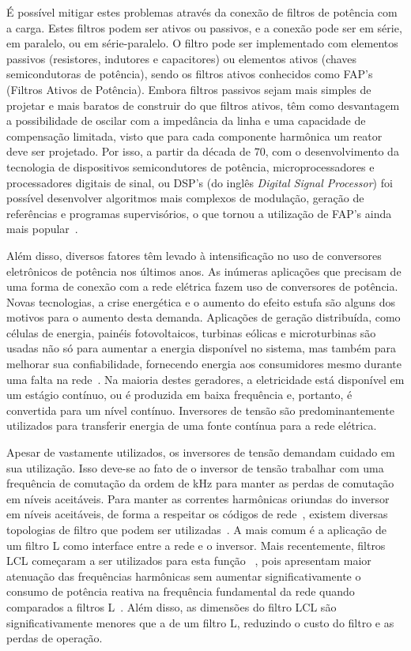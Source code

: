 	É possível mitigar estes problemas através da conexão de filtros de potência
	com a carga. Estes filtros podem ser ativos ou passivos, e a conexão pode ser
	em série, em paralelo, ou em série-paralelo. O filtro pode ser implementado
	com elementos passivos (resistores, indutores e capacitores) ou elementos
	ativos (chaves semicondutoras de potência), sendo os filtros ativos conhecidos
	como FAP's (Filtros Ativos de Potência). Embora filtros passivos sejam mais
	simples de projetar e mais baratos de construir do que filtros ativos, têm como
	desvantagem a possibilidade de oscilar com a impedância da linha e uma capacidade
	de compensação limitada, visto que para cada componente harmônica um reator
	deve ser projetado. Por isso, a partir da década de $70$, com o desenvolvimento
	da tecnologia de dispositivos semicondutores de potência, microprocessadores e
	processadores digitais de sinal, ou DSP's (do inglês \emph{Digital Signal
	Processor}) foi possível desenvolver algoritmos mais complexos de modulação,
	geração de referências e programas supervisórios, o que tornou a utilização de
	FAP's ainda mais popular~\cite{ref:SASAKI}.

	Além disso, diversos fatores têm levado à intensificação no uso de conversores
	eletrônicos	de potência nos últimos anos. As inúmeras aplicações que precisam de
	uma forma de conexão com a rede elétrica fazem uso de conversores de potência.
	Novas tecnologias, a crise energética e o aumento do efeito estufa são alguns dos
	motivos para o aumento desta demanda. Aplicações de geração distribuída, como
	células de energia,	painéis fotovoltaicos, turbinas eólicas e microturbinas são
	usadas não só para aumentar a energia disponível no sistema, mas também para
	melhorar sua confiabilidade, fornecendo energia aos consumidores mesmo durante
	uma falta na rede~\cite{ref:KARSHENAS}.	Na maioria destes geradores, a eletricidade
	está disponível em um estágio contínuo, ou é produzida em baixa frequência e,
	portanto, é convertida para um nível contínuo. Inversores de tensão são
	predominantemente utilizados para transferir energia de uma fonte contínua para
	a rede elétrica.

	Apesar de vastamente utilizados, os inversores de tensão demandam cuidado
	em sua utilização. Isso deve-se ao fato de o inversor de tensão trabalhar
	com uma frequência de comutação da ordem de kHz para manter as perdas de
	comutação em níveis aceitáveis. Para manter as correntes harmônicas oriundas
	do inversor em níveis aceitáveis, de forma a respeitar os códigos de
	rede~\cite{ref:HOLMES}, existem diversas topologias de filtro que podem ser
	utilizadas~\cite{ref:RIBEIRO}. A mais comum é a aplicação de um filtro L como
	interface entre a rede e o inversor. Mais recentemente, filtros LCL começaram
	a ser utilizados para esta função~\cite{ref:LINDGREN}\cite{ref:TEODORESCU}
	\cite{ref:XU}, pois apresentam maior atenuação das frequências harmônicas sem
	aumentar significativamente o consumo de potência reativa na frequência
	fundamental da rede quando comparados a filtros L~\cite{ref:FUCHS}. Além disso,
	as dimensões do filtro LCL são significativamente menores que a de um filtro L,
	reduzindo o custo do filtro e as perdas de operação.

